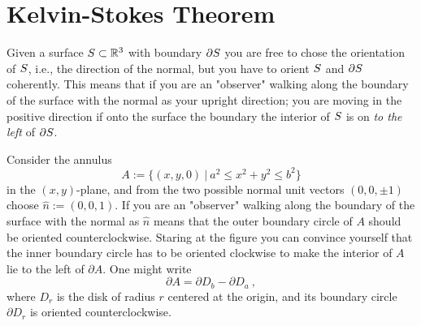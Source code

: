   \section{Kelvin-Stokes Theorem}
  
  Given a surface $S \subset{\mathbb R}^3$ with boundary $\partial S$ you are free to chose the orientation of $S$, i.e., the direction of the normal, but you have to orient $S$ and $\partial S$ coherently. This means that if you are an "observer" walking along the boundary of the surface with the normal as
your upright direction; you are moving in the positive direction if onto the surface the boundary  the interior of $S$ is on \textit{to the left} of $\partial S$.





  
  
\begin{exa}Consider the annulus
\[A:=\{(x,y,0)\ |\ a^2\leq x^2+y^2\leq b^2\}\]
in the $(x,y)$-plane, and from the two possible normal unit vectors $(0,0,\pm 1)$ choose $\hat{n}:=(0,0,1)$. If you are an "observer" walking along the boundary of the surface with the normal as $\hat{n}$ means  that the outer boundary circle  of $A$ should be oriented counterclockwise. Staring at the figure you can convince yourself that the inner boundary circle has to be oriented clockwise to make the interior of $A$ lie to the left of $\partial A$. One might write
$$\partial A=\partial D_b-\partial D_a\ ,$$
where $D_r$ is the disk of radius $r$ centered at the origin, and its boundary circle $\partial D_r$ is oriented counterclockwise.
\end{exa}


\begin{center}
\end{center}


